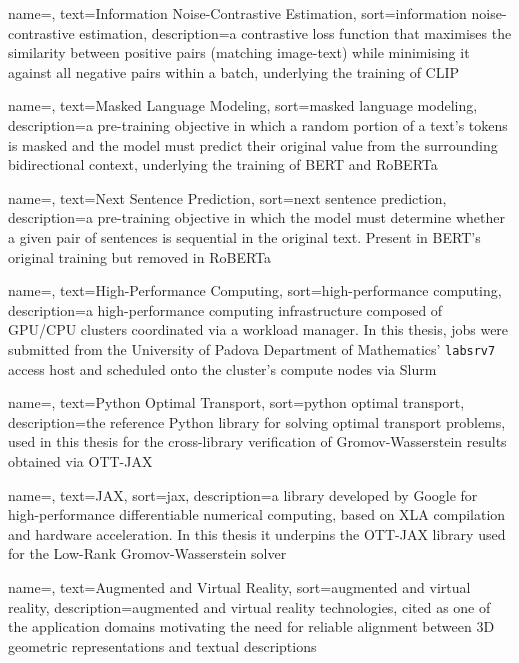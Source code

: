  {
    name=,
    text=Information Noise-Contrastive Estimation,
    sort=information noise-contrastive estimation,
    description={a contrastive loss function that maximises the similarity between positive pairs (matching image-text) while minimising it against all negative pairs within a batch, underlying the training of CLIP}
}

 {
    name=,
    text=Masked Language Modeling,
    sort=masked language modeling,
    description={a pre-training objective in which a random portion of a text's tokens is masked and the model must predict their original value from the surrounding bidirectional context, underlying the training of BERT and RoBERTa}
}

 {
    name=,
    text=Next Sentence Prediction,
    sort=next sentence prediction,
    description={a pre-training objective in which the model must determine whether a given pair of sentences is sequential in the original text. Present in BERT's original training but removed in RoBERTa}
}

 {
    name=,
    text=High-Performance Computing,
    sort=high-performance computing,
    description={a high-performance computing infrastructure composed of GPU/CPU clusters coordinated via a workload manager. In this thesis, jobs were submitted from the University of Padova Department of Mathematics' \texttt{labsrv7} access host and scheduled onto the cluster's compute nodes via Slurm}
}

 {
    name=,
    text=Python Optimal Transport,
    sort=python optimal transport,
    description={the reference Python library for solving optimal transport problems, used in this thesis for the cross-library verification of Gromov-Wasserstein results obtained via OTT-JAX}
}

 {
    name=,
    text=JAX,
    sort=jax,
    description={a library developed by Google for high-performance differentiable numerical computing, based on XLA compilation and hardware acceleration. In this thesis it underpins the OTT-JAX library used for the Low-Rank Gromov-Wasserstein solver}
}

 {
    name=,
    text=Augmented and Virtual Reality,
    sort=augmented and virtual reality,
    description={augmented and virtual reality technologies, cited as one of the application domains motivating the need for reliable alignment between 3D geometric representations and textual descriptions}
}

